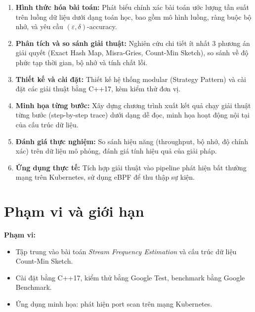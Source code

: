 \begin{enumerate}
    \item \textbf{Hình thức hóa bài toán:} Phát biểu chính xác bài toán ước lượng tần suất trên luồng dữ liệu dưới dạng toán học, bao gồm mô hình luồng, ràng buộc bộ nhớ, và yêu cầu $(\varepsilon, \delta)$-accuracy.

    \item \textbf{Phân tích và so sánh giải thuật:} Nghiên cứu chi tiết ít nhất 3 phương án giải quyết (Exact Hash Map, Misra-Gries, Count-Min Sketch), so sánh về độ phức tạp thời gian, bộ nhớ và tính chất lỗi.

    \item \textbf{Thiết kế và cài đặt:} Thiết kế hệ thống modular (Strategy Pattern) và cài đặt các giải thuật bằng C++17, kèm kiểm thử đơn vị.

    \item \textbf{Minh họa từng bước:} Xây dựng chương trình xuất kết quả chạy giải thuật từng bước (step-by-step trace) dưới dạng dễ đọc, minh họa hoạt động nội tại của cấu trúc dữ liệu.

    \item \textbf{Đánh giá thực nghiệm:} So sánh hiệu năng (throughput, bộ nhớ, độ chính xác) trên dữ liệu mô phỏng, đánh giá tính hiệu quả của giải pháp.

    \item \textbf{Ứng dụng thực tế:} Tích hợp giải thuật vào pipeline phát hiện bất thường mạng trên Kubernetes, sử dụng eBPF để thu thập sự kiện.
\end{enumerate}

\section*{Phạm vi và giới hạn}

\textbf{Phạm vi:}
\begin{itemize}
    \item Tập trung vào bài toán \textit{Stream Frequency Estimation} và cấu trúc dữ liệu Count-Min Sketch.
    \item Cài đặt bằng C++17, kiểm thử bằng Google Test, benchmark bằng Google Benchmark.
    \item Ứng dụng minh họa: phát hiện port scan trên mạng Kubernetes.
\end{itemize}

